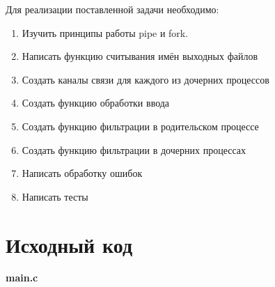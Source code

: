 Для реализации поставленной задачи необходимо:

\begin{enumerate}
    \item Изучить принципы работы pipe и fork.
    \item Написать функцию считывания имён выходных файлов
    \item Создать каналы связи для каждого из дочерних процессов
    \item Создать функцию обработки ввода
    \item Создать функцию фильтрации в родительском процессе
    \item Создать функцию фильтрации в дочерних процессах
    \item Написать обработку ошибок
    \item Написать тесты
\end{enumerate}

\pagebreak

\section{Исходный код}

\textbf{main.c}

